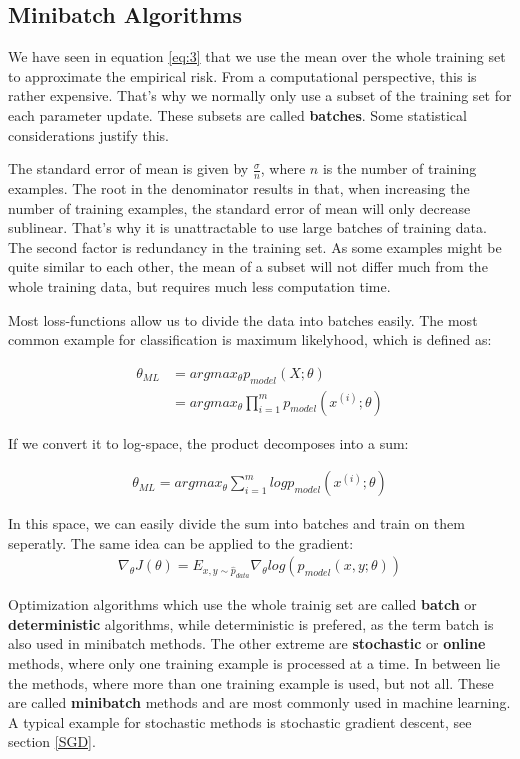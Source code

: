 \subsection{Minibatch Algorithms}\label{sub:Minibatch}
We have seen in equation \ref{eq:3} that we use the mean over the whole training
set to approximate the empirical risk. From a computational perspective, this is
rather expensive. That's why we normally only use a subset of the training set
for each parameter update. These subsets are called \textbf{batches}. Some statistical
considerations justify this.

The standard error of mean is given by $\frac{\sigma}{n}$, where $n$ is the
number of training examples. The root in the denominator results in that, when
increasing the number of training examples, the standard error of mean will
only decrease sublinear. That's why it is unattractable to use large batches of
training data. The second factor is redundancy in the training set. As some
examples might be quite similar to each other, the mean of a subset will not
differ much from the whole training data, but requires much less computation
time.

Most loss-functions allow us to divide the data into batches easily. The most
common example for classification is maximum likelyhood, which is defined as:

\begin{align}
    \theta_{ML}
    & = argmax_{\theta} p_{model}(X; \theta) \\
    & = argmax_{\theta} \prod_{i=1}^m p_{model}(x^{(i)}; \theta)
\end{align}

If we convert it to log-space, the product decomposes into a sum:

\begin{align}
    \theta_{ML} = argmax_{\theta} \sum_{i=1}^m log p_{model}(x^{(i)}; \theta)
\end{align}

In this space, we can easily divide the sum into batches and train on them
seperatly. The same idea can be applied to the gradient:
\begin{align}
    \nabla_\theta J(\theta)=E_{x,y\sim \hat{p}_{data}} \nabla_\theta log(p_{model}(x,y;\theta))
\end{align}

Optimization algorithms which use the whole trainig set are called
\textbf{batch} or \textbf{deterministic} algorithms, while deterministic is
prefered, as the term batch is also used in minibatch methods. The other extreme
are \textbf{stochastic} or \textbf{online} methods, where only one training
example is processed at a time. In between lie the methods, where more than one
training example is used, but not all. These are called \textbf{minibatch}
methods and are most commonly used in machine learning. A typical example for
stochastic methods is stochastic gradient descent, see section \ref{SGD}.


